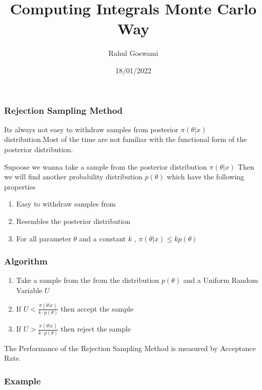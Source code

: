 \documentclass[
]{article}
\title{Computing Integrals Monte Carlo Way}
\author{Rahul Goswami}
\date{18/01/2022}
\providecommand{\tightlist}{%
  \setlength{\itemsep}{0pt}\setlength{\parskip}{0pt}}
\begin{document}
\maketitle

\hypertarget{rejection-sampling-method}{%
\subsubsection{Rejection Sampling
Method}\label{rejection-sampling-method}}

Its always not easy to withdraw samples from posterior \(\pi(\theta|x)\)
distribution.Most of the time are not familiar with the functional form
of the posterior distribution.

Supoose we wanna take a sample from the posterior distribution
\(\pi(\theta|x)\) Then we will find another probability distribution
\(p(\theta)\) which have the following properties

\begin{enumerate}
\def\labelenumi{\arabic{enumi}.}
\tightlist
\item
  Easy to withdraw samples from
\item
  Resembles the posterior distribution
\item
  For all parameter \(\theta\) and a constant \(k\) ,
  \(\pi(\theta|x) \leq k p(\theta)\)
\end{enumerate}

\hypertarget{algorithm}{%
\subsubsection{Algorithm}\label{algorithm}}

\begin{enumerate}
\def\labelenumi{\arabic{enumi}.}
\tightlist
\item
  Take a sample from the from the distribution \(p(\theta)\) and a
  Uniform Random Variable \(U\)
\item
  If \(U < \frac{\pi(\theta|x)}{k \cdot p(\theta)}\) then accept the
  sample
\item
  If \(U > \frac{\pi(\theta|x)}{k \cdot p(\theta)}\) then reject the
  sample
\end{enumerate}

The Performance of the Rejection Sampling Method is measured by
Acceptance Rate.

\hypertarget{example}{%
\subsubsection{Example}\label{example}}
\end{document}
